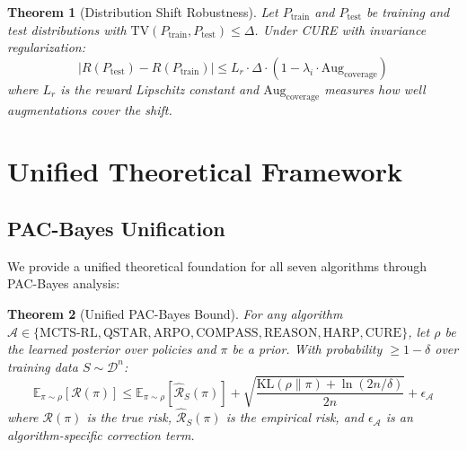 \documentclass[11pt,a4paper]{article}
\newtheorem{theorem}{Theorem}[section]
\newcommand{\E}{\mathbb{E}}
\newcommand{\KL}{\text{KL}}
\newcommand{\TV}{\text{TV}}
\newcommand{\calD}{\mathcal{D}}
\newcommand{\calR}{\mathcal{R}}
\newcommand{\calA}{\mathcal{A}}
\begin{document}
\begin{theorem}[Distribution Shift Robustness]
\label{thm:cure_robust}
Let $P_{\text{train}}$ and $P_{\text{test}}$ be training and test distributions with $\TV(P_{\text{train}}, P_{\text{test}}) \leq \Delta$. Under CURE with invariance regularization:
\begin{equation}
    |R(P_{\text{test}}) - R(P_{\text{train}})| \leq L_r \cdot \Delta \cdot (1 - \lambda_i \cdot \text{Aug}_{\text{coverage}})
\end{equation}
where $L_r$ is the reward Lipschitz constant and $\text{Aug}_{\text{coverage}}$ measures how well augmentations cover the shift.
\end{theorem}

\section{Unified Theoretical Framework}

\subsection{PAC-Bayes Unification}

We provide a unified theoretical foundation for all seven algorithms through PAC-Bayes analysis:

\begin{theorem}[Unified PAC-Bayes Bound]
\label{thm:unified_pac}
For any algorithm $\calA \in \{\text{MCTS-RL}, \text{QSTAR}, \text{ARPO}, \text{COMPASS}, \text{REASON}, \text{HARP}, \text{CURE}\}$, let $\rho$ be the learned posterior over policies and $\pi$ be a prior. With probability $\geq 1-\delta$ over training data $S \sim \calD^n$:
\begin{equation}
    \E_{\pi \sim \rho}[\calR(\pi)] \leq \E_{\pi \sim \rho}[\hat{\calR}_S(\pi)] + \sqrt{\frac{\KL(\rho \| \pi) + \ln(2n/\delta)}{2n}} + \epsilon_{\calA}
\end{equation}
where $\calR(\pi)$ is the true risk, $\hat{\calR}_S(\pi)$ is the empirical risk, and $\epsilon_{\calA}$ is an algorithm-specific correction term.
\end{theorem}
\end{document}
